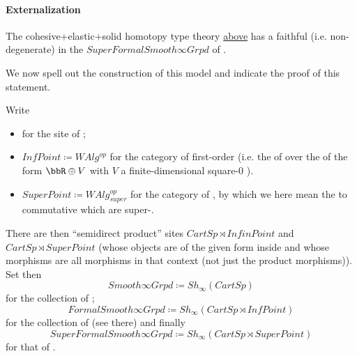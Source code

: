 \hypertarget{Externalization}{}\paragraph*{{Externalization}}\label{Externalization}
\begin{theorem}
\label{SupergeometryIsModel}\hypertarget{SupergeometryIsModel}{}
The cohesive+elastic+solid homotopy type theory \hyperlink{ObjectiveLogic}{above} has a faithful (i.e. non-degenerate)  in the  $SuperFormalSmooth\infty Grpd$ of .
\end{theorem}
We now spell out the construction of this model and indicate the proof of this statement.
\begin{defn}
\label{SupergeometricModel}\hypertarget{SupergeometricModel}{}
Write
\begin{itemize}%
\item {} for the site of ;
\item $InfPoint \coloneqq WAlg^{op}$ for the category of first-order  (i.e. the  of  over the  of the form $\bbR\oplus V$ with $V$ a finite-dimensional square-0 ).
\item $SuperPoint \coloneqq WAlg_{super}^{op}$ for the category of , by which we here mean the  to commutative  which are super-.
\end{itemize}
There are then ``semidirect product'' sites $CartSp \rtimes InfinPoint$ and $CartSp \rtimes SuperPoint$ (whose objects are  of the given form inside  and whose morphisms are all morphisms in that context (not just the product morphisms)).
Set then
\begin{displaymath}
Smooth \infty Grpd \coloneqq Sh_\infty(CartSp)
\end{displaymath}
for the collection of ;
\begin{displaymath}
FormalSmooth\infty Grpd \coloneqq Sh_\infty(CartSp \rtimes InfPoint)
\end{displaymath}
for the collection of  (see there) and finally
\begin{displaymath}
SuperFormalSmooth\infty Grpd \coloneqq Sh_\infty(CartSp \rtimes SuperPoint)
\end{displaymath}
for that of .
\end{defn}
